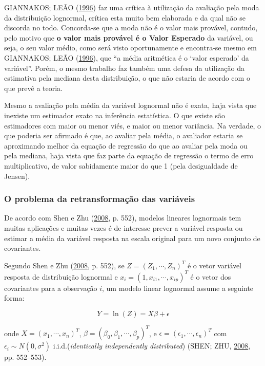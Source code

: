 \documentclass[a4paper, 12pt]{article}
\begin{document}
GIANNAKOS; LEÃO (\protect\hyperlink{ref-giannakos}{1996}) faz uma
crítica à utilização da avaliação pela moda da distribuição lognormal,
crítica esta muito bem elaborada e da qual não se discorda no todo.
Concorda-se que a moda não é o valor mais provável, contudo, pelo motivo
que \textbf{o valor mais provável é o Valor Esperado} da variável, ou
seja, o seu valor médio, como será visto oportunamente e encontra-se
mesmo em GIANNAKOS; LEÃO (\protect\hyperlink{ref-giannakos}{1996}), que
``a média aritmética é o `valor esperado' da variável''. Porém, o mesmo
trabalho faz também uma defesa da utilização da estimativa pela mediana
desta distribuição, o que não estaria de acordo com o que prevê a
teoria.

Mesmo a avaliação pela média da variável lognormal não é exata, haja
vista que inexiste um estimador exato na inferência estatística. O que
existe são estimadores com maior ou menor viés, e maior ou menor
variância. Na verdade, o que poderia ser afirmado é que, ao avaliar pela
média, o avaliador estaria se aproximando melhor da equação de regressão
do que ao avaliar pela moda ou pela mediana, haja vista que faz parte da
equação de regressão o termo de erro multiplicativo, de valor
sabidamente maior do que 1 (pela desigualdade de Jensen).

\subsubsection{O problema da retransformação das
variáveis}\label{o-problema-da-retransformacao-das-variaveis}

De acordo com Shen e Zhu (\protect\hyperlink{ref-shen}{2008}, p. 552),
modelos lineares lognormais tem muitas aplicações e muitas vezes é de
interesse prever a variável resposta ou estimar a média da variável
resposta na escala original para um novo conjunto de covariantes.

Segundo Shen e Zhu (\protect\hyperlink{ref-shen}{2008}, p. 552), se
\(Z = (Z_1,\cdots, Z_n)^T\) é o vetor variável resposta de distribuição
lognormal e \(x_i = (1, x_{i1}, \cdots, x_{ip})^T\) é o vetor dos
covariantes para a observação \(i\), um modelo linear lognormal assume a
seguinte forma:

\[Y = \ln(Z) = X\beta + \epsilon\]

onde \(X = (x_1, \cdots, x_n)^T\),
\(\beta = (\beta_0, \beta_1, \cdots, \beta_p)^T\), e
\(\epsilon = (\epsilon_1, \cdots, \epsilon_n)^T\) com
\(\epsilon_i \sim N(0, \sigma^2)\) i.i.d.(\emph{identically
independently distributed}) (SHEN; ZHU,
\protect\hyperlink{ref-shen}{2008}, pp. 552--553).
\end{document}
